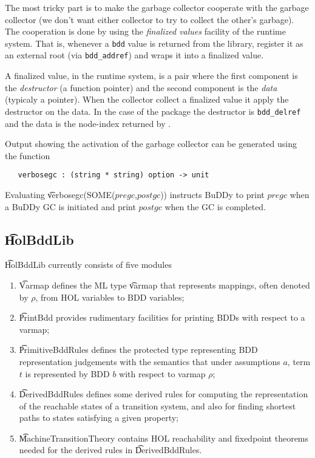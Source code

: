 The most tricky part is to make the \mosml{} garbage collector cooperate
with the \Buddy{} garbage collector (we don't want either collector to
try to collect the other's garbage).  The cooperation is done by using
the \emph{finalized values} facility of the \mosml{} runtime system.
That is, whenever a \texttt{bdd} value is returned from the \Buddy{}
library, \Muddy{} register it as an external root (via
\verb+bdd_addref+) and wraps it into a finalized value.  

A finalized value, in the \mosml{} runtime system, is a pair where the
first component is the \emph{destructor} (a function pointer) and the
second component is the \emph{data} (typicaly a pointer).  When the
\mosml{} collector collect a finalized value it apply the destructor on
the data.  In the case of the \Muddy{} package the destructor is
\verb+bdd_delref+ and the data is the node-index returned by \Buddy{}.

Output showing the activation of the \Buddy{} garbage collector can be generated
using the function

\begin{verbatim}
   verbosegc : (string * string) option -> unit
\end{verbatim}

Evaluating \t{verbosegc(SOME($pregc$,$postgc$))} instructs BuDDy to print
$pregc$ when a BuDDy GC is initiated and print $postgc$ when the
\Buddy{} GC is completed.

\subsection{\t{HolBddLib}}\label{HolBddLib}

\t{HolBddLib} currently consists of five modules

\begin{enumerate}
\item \t{Varmap} defines the ML type \t{varmap} that represents mappings,
often denoted by $\rho$,
from HOL variables to BDD variables;

\item \t{PrintBdd} provides rudimentary facilities for printing
BDDs with respect to a varmap;

\item \t{PrimitiveBddRules} defines the protected type \termbddty
representing BDD representation judgements 
with the semantics that under assumptions $a$, term $t$ is represented by BDD $b$ with respect to
varmap $\rho$;

\item \t{DerivedBddRules} defines some derived rules for computing
the representation of the reachable states of a transition system,
and also for finding shortest paths to states  satisfying a given property;

\item \t{MachineTransitionTheory} contains HOL reachability and fixedpoint theorems needed
for the derived rules in  \t{DerivedBddRules}.


\end{enumerate}


